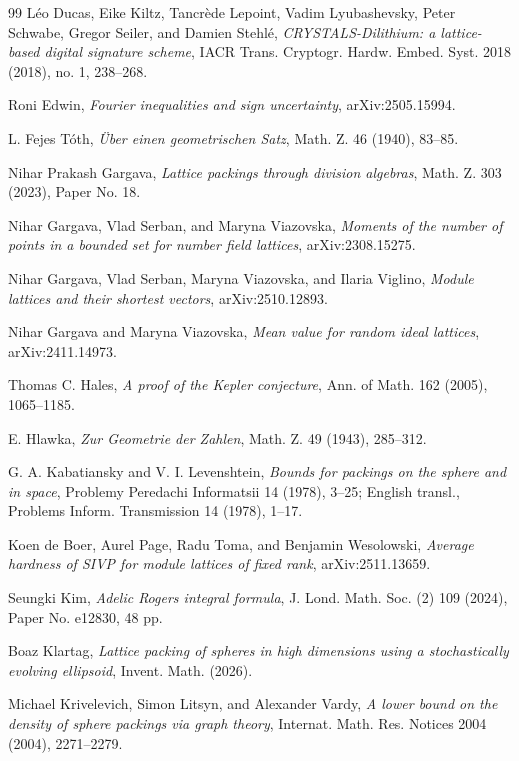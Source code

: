 \documentclass[11pt]{article}
\theoremstyle{remark}
\begin{document}
\begin{thebibliography}{99}
L\'eo Ducas, Eike Kiltz, Tancr\`ede Lepoint, Vadim Lyubashevsky, Peter Schwabe,
Gregor Seiler, and Damien Stehl\'e,
\emph{CRYSTALS-Dilithium: a lattice-based digital signature scheme},
IACR Trans. Cryptogr. Hardw. Embed. Syst. 2018 (2018), no. 1, 238--268.


Roni Edwin,
\emph{Fourier inequalities and sign uncertainty},
arXiv:2505.15994.

L. Fejes T\'oth,
\emph{{\"U}ber einen geometrischen Satz},
Math. Z. 46 (1940), 83--85.

Nihar Prakash Gargava,
\emph{Lattice packings through division algebras},
Math. Z. 303 (2023), Paper No. 18.

Nihar Gargava, Vlad Serban, and Maryna Viazovska,
\emph{Moments of the number of points in a bounded set for number field
lattices},
arXiv:2308.15275.

Nihar Gargava, Vlad Serban, Maryna Viazovska, and Ilaria Viglino,
\emph{Module lattices and their shortest vectors},
arXiv:2510.12893.

Nihar Gargava and Maryna Viazovska,
\emph{Mean value for random ideal lattices},
arXiv:2411.14973.

Thomas C. Hales,
\emph{A proof of the Kepler conjecture},
Ann. of Math. 162 (2005), 1065--1185.

E. Hlawka,
\emph{Zur Geometrie der Zahlen},
Math. Z. 49 (1943), 285--312.

G. A. Kabatiansky and V. I. Levenshtein,
\emph{Bounds for packings on the sphere and in space},
Problemy Peredachi Informatsii 14 (1978), 3--25;
English transl., Problems Inform. Transmission 14 (1978), 1--17.

Koen de Boer, Aurel Page, Radu Toma, and Benjamin Wesolowski,
\emph{Average hardness of SIVP for module lattices of fixed rank},
arXiv:2511.13659.

Seungki Kim,
\emph{Adelic Rogers integral formula},
J. Lond. Math. Soc. (2) 109 (2024), Paper No. e12830, 48 pp.

Boaz Klartag,
\emph{Lattice packing of spheres in high dimensions using a stochastically
evolving ellipsoid},
Invent. Math. (2026).

Michael Krivelevich, Simon Litsyn, and Alexander Vardy,
\emph{A lower bound on the density of sphere packings via graph theory},
Internat. Math. Res. Notices 2004 (2004), 2271--2279.


\end{thebibliography}
\end{document}
